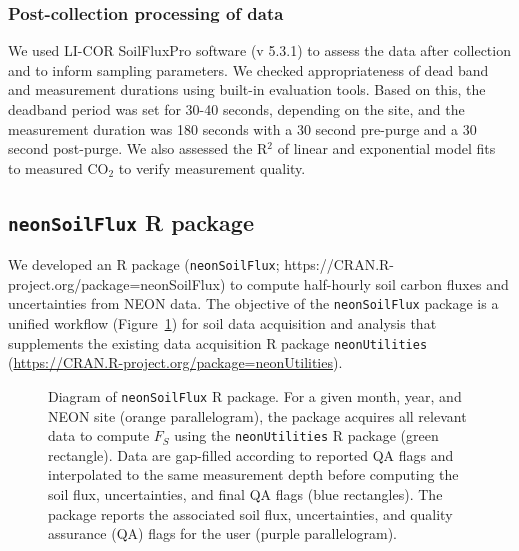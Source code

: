 \documentclass[
  letterpaper,
  DIV=11,
  numbers=noendperiod]{scrartcl}
\begin{document}
\normalsize

\subsubsection{Post-collection processing of
data}\label{post-collection-processing-of-data}

We used LI-COR SoilFluxPro software (v 5.3.1) to assess the data after
collection and to inform sampling parameters. We checked appropriateness
of dead band and measurement durations using built-in evaluation tools.
Based on this, the deadband period was set for 30-40 seconds, depending
on the site, and the measurement duration was 180 seconds with a 30
second pre-purge and a 30 second post-purge. We also assessed the
R\(^{2}\) of linear and exponential model fits to measured CO\(_{2}\) to
verify measurement quality.

\subsection{\texorpdfstring{\texttt{neonSoilFlux} R
package}{neonSoilFlux R package}}\label{neonsoilflux-r-package}

We developed an R package (\texttt{neonSoilFlux};
https://CRAN.R-project.org/package=neonSoilFlux) to compute half-hourly
soil carbon fluxes and uncertainties from NEON data. The objective of
the \texttt{neonSoilFlux} package is a unified workflow
(Figure~\ref{fig-package-diagram}) for soil data acquisition and
analysis that supplements the existing data acquisition R package
\texttt{neonUtilities}
(\url{https://CRAN.R-project.org/package=neonUtilities}).

\begin{figure}


\caption{\label{fig-package-diagram}Diagram of \texttt{neonSoilFlux} R
package. For a given month, year, and NEON site (orange parallelogram),
the package acquires all relevant data to compute \(F_{S}\) using the
\texttt{neonUtilities} R package (green rectangle). Data are gap-filled
according to reported QA flags and interpolated to the same measurement
depth before computing the soil flux, uncertainties, and final QA flags
(blue rectangles). The package reports the associated soil flux,
uncertainties, and quality assurance (QA) flags for the user (purple
parallelogram).}

\end{figure}%
\end{document}
